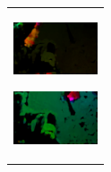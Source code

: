 \begin{figure}[htbp]
\begin{tabular}{l}
      \begin{minipage}{0.165\hsize}
        \begin{center}
          \includegraphics[clip, width=2.5cm]{./Figures/optic_seevictim4.eps}
          \hspace{0.1cm} { }
        \end{center}
      \end{minipage}
      \begin{minipage}{0.165\hsize}
        \begin{center}
          \includegraphics[clip, width=2.5cm]{./Figures/optic_seevictim5.eps}
          \hspace{2.2cm} { }
        \end{center}
      \end{minipage}
\\ %


\end{tabular}
\end{figure}
